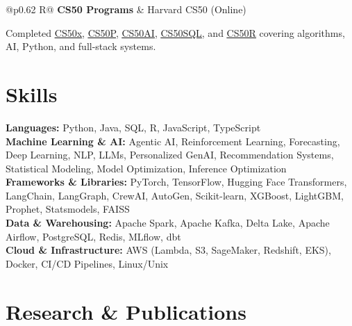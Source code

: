 \documentclass[a4paper,10pt]{article}
\newcommand{\ulink}[2]{\href{#1}{\uline{#2}}}
\newcommand{\subheading}[1]{{\color[HTML]{0A0A0A}\fontsize{12}{14}\selectfont\bfseries #1}}
\newcommand{\meta}[1]{{\color[HTML]{5C5C5C}\fontsize{10.5}{12.5}\selectfont #1}}
\begin{document}
\begin{tabularx}{\linewidth}{@{}p{0.62\linewidth} R@{}}
\subheading{CS50 Programs} & \meta{Harvard CS50 (Online)}
\end{tabularx}
\vspace{1pt}
{\color[HTML]{3A3A3A}\fontsize{11}{14}\selectfont Completed \ulink{https://cs50.harvard.edu/certificates/b14b78df-e05c-413e-a607-1dd27303053a}{CS50x}, \ulink{https://cs50.harvard.edu/certificates/32477052-9db4-49c4-a5a4-d7e58429ca2c}{CS50P}, \ulink{https://cs50.harvard.edu/certificates/9cdb4d4a-1250-4f8e-9fd7-191864e0f919}{CS50AI}, \ulink{https://cs50.harvard.edu/certificates/bc486f24-f085-4e61-8536-80940b97a1b9}{CS50SQL}, and \ulink{https://cs50.harvard.edu/certificates/666838e6-a053-4d82-b179-a60fe745fd84}{CS50R} covering algorithms, AI, Python, and full-stack systems.}

\vspace{2pt}

\section{Skills}
\vspace{5pt}
{\color[HTML]{0A0A0A}\fontsize{11}{14}\selectfont
\textbf{Languages:} Python, Java, SQL, R, JavaScript, TypeScript \\[2pt]
\textbf{Machine Learning \& AI:} Agentic AI, Reinforcement Learning, Forecasting, Deep Learning, NLP, LLMs, Personalized GenAI, Recommendation Systems, Statistical Modeling, Model Optimization, Inference Optimization \\[2pt]
\textbf{Frameworks \& Libraries:} PyTorch, TensorFlow, Hugging Face Transformers, LangChain, LangGraph, CrewAI, AutoGen, Scikit-learn, XGBoost, LightGBM, Prophet, Statsmodels, FAISS \\[2pt]
\textbf{Data \& Warehousing:} Apache Spark, Apache Kafka, Delta Lake, Apache Airflow, PostgreSQL, Redis, MLflow, dbt \\[2pt]
\textbf{Cloud \& Infrastructure:} AWS (Lambda, S3, SageMaker, Redshift, EKS), Docker, CI/CD Pipelines, Linux/Unix}

\vspace{2pt}

\section{Research \& Publications}
\vspace{2pt}
\end{document}
